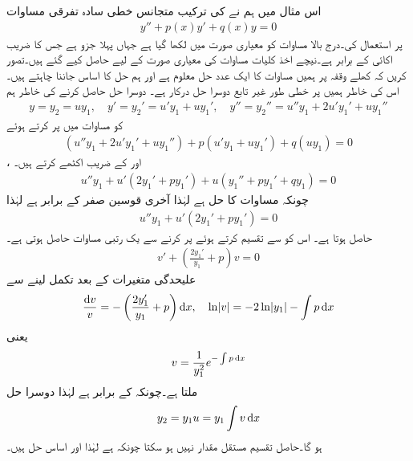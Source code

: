 اس مثال میں ہم نے  کی ترکیب متجانس خطی سادہ تفرقی مساوات 
\begin{align}\label{مساوات_سادہ_دو_درجی_متجانس_تخفیف_الف}
y''+p(x)y'+q(x)y=0
\end{align}
پر استعمال کی۔درج بالا مساوات کو معیاری صورت میں لکھا گیا ہے جہاں پہلا جزو  ہے جس کا  ضریب  اکائی کے برابر ہے۔نیچے اخذ کلیات مساوات کی معیاری صورت کے لیے حاصل کیے گئے ہیں۔تصور کریں کہ کھلے وقفہ  پر ہمیں مساوات  کا ایک عدد حل  معلوم ہے اور ہم حل کا اساس جاننا چاہتے ہیں۔ اس کی خاطر ہمیں  پر خطی طور غیر تابع دوسرا حل  درکار ہے۔  دوسرا حل حاصل کرنے کی خاطر ہم
\begin{align*}
y=y_2=uy_1, \quad y'=y_2'=u'y_1+uy_1',\quad y''=y_2''=u''y_1+2u'y_1'+uy_1''
\end{align*}
کو مساوات  میں پر کرتے ہوئے 
\begin{align*}
(u''y_1+2u'y_1'+uy_1'')+p(u'y_1+uy_1')+q(uy_1)=0
\end{align*}
،  اور  کے  ضریب  اکٹھے کرتے ہیں۔
\begin{align*}
u''y_1+u'(2y_1'+py_1')+u(y_1''+py_1'+qy_1)=0
\end{align*}
چونکہ  مساوات  کا حل ہے لہٰذا آخری قوسین صفر کے برابر ہے لہٰذا
\begin{align*}
u''y_1+u'(2y_1'+py_1')=0
\end{align*}
حاصل ہوتا ہے۔ اس کو   سے تقسیم کرتے ہوئے  پر کرنے سے  یک رتبی مساوات حاصل ہوتی ہے۔
 \begin{align*}
v'+\left(\frac{2y_1'}{y_1}+p\right)v=0
\end{align*}
علیحدگی متغیرات کے بعد تکمل لینے سے
\begin{align*}
\frac{\dif v}{v}=-\left(\frac{2y_1'}{y_1}+p\right) \dif x, \quad \ln \abs{v}=-2\ln \abs{y_1}-\int p \dif x
\end{align*}
یعنی
\begin{align}\label{مساوات_دوسری_دوسرے_حل_کا_جزو_ضربی}
v=\frac{1}{y_1^2}e^{-\int p\dif x}
\end{align}
ملتا ہے۔چونکہ  کے برابر ہے لہٰذا دوسرا حل
\begin{align}
y_2=y_1u=y_1 \int v \dif x
\end{align}
ہو گا۔حاصل تقسیم  مستقل مقدار نہیں ہو سکتا چونکہ  ہے لہٰذا  اور  اساس حل ہیں۔

